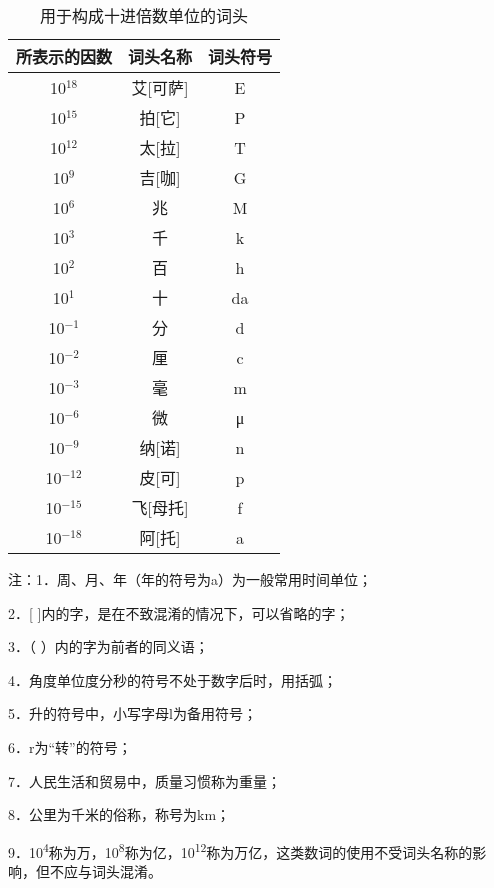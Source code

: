 \begin{table}[htbp]
  \centering
  \caption{用于构成十进倍数单位的词头}
  \begin{tabular}{ccc}
    \toprule
    所表示的因数     & 词头名称  & 词头符号 \\
    \midrule
    10$^{18}$  & 艾[可萨] & E    \\
    10$^{15}$  & 拍[它]  & P    \\
    10$^{12}$  & 太[拉]  & T    \\
    10$^{9}$   & 吉[咖]  & G    \\
    10$^{6}$   & 兆     & M    \\
    10$^{3}$   & 千     & k    \\
    10$^{2}$   & 百     & h    \\
    10$^{1}$   & 十     & da   \\
    10$^{-1}$  & 分     & d    \\
    10$^{-2}$  & 厘     & c    \\
    10$^{-3}$  & 毫     & m    \\
    10$^{-6}$  & 微     & μ    \\
    10$^{-9}$  & 纳[诺]  & n    \\
    10$^{-12}$ & 皮[可]  & p    \\
    10$^{-15}$ & 飞[母托] & f    \\
    10$^{-18}$ & 阿[托]  & a    \\
    \bottomrule
  \end{tabular}%
  \label{tab:addlabel}%
\end{table}%

\parbox[t]{\textwidth}{
注：1．周、月、年（年的符号为a）为一般常用时间单位；

\hspace{2em}2．{[} {]}内的字，是在不致混淆的情况下，可以省略的字；

\hspace{2em}3．（ ）内的字为前者的同义语；

\hspace{2em}4．角度单位度分秒的符号不处于数字后时，用括弧；

\hspace{2em}5．升的符号中，小写字母l为备用符号；

\hspace{2em}6．r为``转''的符号；

\hspace{2em}7．人民生活和贸易中，质量习惯称为重量；

\hspace{2em}8．公里为千米的俗称，称号为km；

\hspace{2em}9．10\textsuperscript{4}称为万，10\textsuperscript{8}称为亿，10\textsuperscript{12}称为万亿，这类数词的使用不受词头名称的影响，但不应与词头混淆。
}


